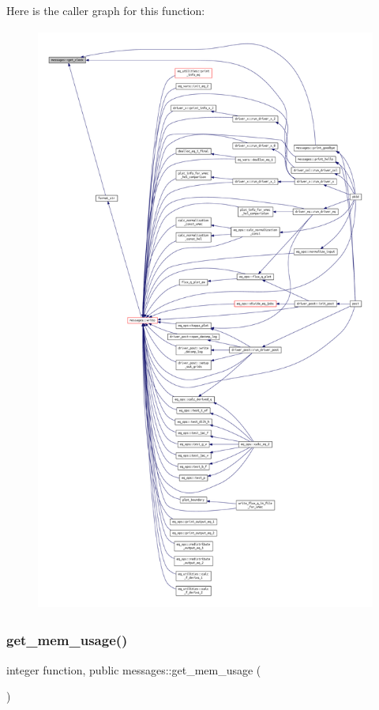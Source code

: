 Here is the caller graph for this function\+:
\nopagebreak
\begin{figure}[H]
\begin{center}
\leavevmode
\includegraphics[height=550pt]{namespacemessages_a61fd0b51b5e37d58fdc993c01792a3fd_icgraph}
\end{center}
\end{figure}
\mbox{\label{namespacemessages_a82dddaab795b78b3d39e1ff1aab2f665}} 
\subsubsection{\texorpdfstring{get\+\_\+mem\+\_\+usage()}{get\_mem\_usage()}}
{\footnotesize\ttfamily integer function, public messages\+::get\+\_\+mem\+\_\+usage (\begin{DoxyParamCaption}{ }\end{DoxyParamCaption})}



